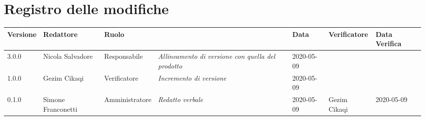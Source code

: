 \section*{Registro delle modifiche}
\renewcommand{\arraystretch}{1.8}

  \setlength\LTleft{-1.7cm}
  \begin{longtable}{|p{1.7cm}|p{2cm}|p{2.5cm}|p{3cm}|p{1.7cm}|p{2cm}|p{2.3cm}|}
    \hline

    \rowcolor{header}
    \textbf{Versione} & \textbf{Redattore} & \textbf{Ruolo} & \centering{\textbf{Descrizione}} & \textbf{Data} & \textbf{Verificatore} & \textbf{Data Verifica}\\

    \hline
    3.0.0 & Nicola Salvadore & Responsabile & \small{\textit{Allineamento di versione con quella del prodotto}} & 2020-05-09 & &\\
    1.0.0 & Gezim Cikaqi & Verificatore & \small{\textit{Incremento di versione}} & 2020-05-09 & &\\
	0.1.0 & Simone Franconetti & Amministratore & \small{\textit{Redatto verbale}} & 2020-05-09 & Gezim Cikaqi & 2020-05-09 \\
    \hline
  \end{longtable}
  \setlength\LTleft{0cm}
